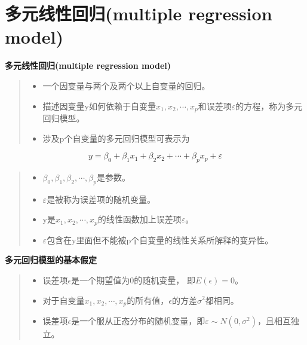 \documentclass[]{ctexbook}
\providecommand{\tightlist}{%
  \setlength{\itemsep}{0pt}\setlength{\parskip}{0pt}}
\begin{document}
\hypertarget{ux591aux5143ux7ebfux6027ux56deux5f52multiple-regression-model}{%
\section{多元线性回归(multiple regression model)}\label{ux591aux5143ux7ebfux6027ux56deux5f52multiple-regression-model}}

\textbf{多元线性回归(multiple regression model)}

\begin{quote}
\begin{itemize}
\tightlist
\item
  一个因变量与两个及两个以上自变量的回归。
\item
  描述因变量y如何依赖于自变量\(x_1,x_2,\cdots,x_p\)和误差项\(\varepsilon\)的方程，称为多元回归模型。
\item
  涉及p个自变量的多元回归模型可表示为
\end{itemize}
\end{quote}

\[y=\beta_0+\beta_1x_1+\beta_2x_2+\cdots+\beta_px_p+\varepsilon\]

\begin{quote}
\begin{itemize}
\tightlist
\item
  \(\beta_0,\beta_1,\beta_2,\cdots,\beta_p\)是参数。
\item
  \(\varepsilon\)是被称为误差项的随机变量。
\item
  y是\(x_1,x_2,\cdots,x_p\)的线性函数加上误差项\(\varepsilon\)。
\item
  \(\varepsilon\)包含在y里面但不能被p个自变量的线性关系所解释的变异性。
\end{itemize}
\end{quote}

\textbf{多元回归模型的基本假定}

\begin{quote}
\begin{itemize}
\tightlist
\item
  误差项\(\epsilon\)是一个期望值为0的随机变量， 即\(E(\epsilon)=0\)。
\item
  对于自变量\(x_1,x_2,\cdots,x_p\)的所有值，\(\epsilon\)的方差\(\sigma^2\)都相同。
\item
  误差项\(\epsilon\)是一个服从正态分布的随机变量，即\(\varepsilon\sim N(0,\sigma^2)\)，且相互独立。
\end{itemize}
\end{quote}
\end{document}
